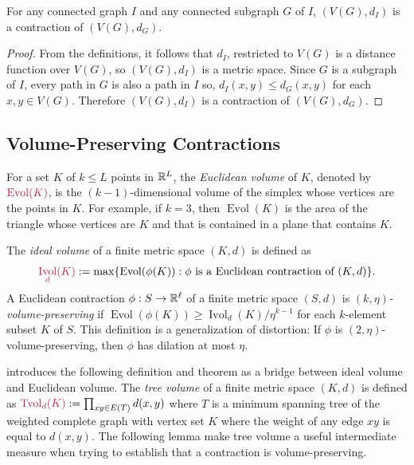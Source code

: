 \documentclass{patmorin}
\makeatletter
\renewcommand{\ge}{\geqslant}
\renewcommand{\le}{\leqslant}
\newcommand{\defin}[1]{\emph{\textcolor{brightmaroon}{#1}}}
\def\mathcolor#1#{\@mathcolor{#1}}
\def\@mathcolor#1#2#3{%
  \protect\leavevmode
  \begingroup
    \color#1{#2}#3%
  \endgroup
}
\newcommand{\mathdefin}[1]{\mathcolor{brightmaroon}{#1}}
\DeclareMathOperator{\evol}{Evol}
\DeclareMathOperator{\ivol}{Ivol}
\DeclareMathOperator{\tvol}{Tvol}
\makeatother
\begin{document}
\begin{obs}\label{supergraph_contraction}
  For any connected graph $I$ and any connected subgraph $G$ of $I$, $(V(G),d_I)$ is a contraction of $(V(G),d_G)$.
\end{obs}

\begin{proof}
  From the definitions, it follows that $d_I$, restricted to $V(G)$ is a distance function over $V(G)$, so $(V(G),d_I)$ is a metric space.  Since $G$ is a subgraph of $I$, every path in $G$ is also a path in $I$ so, $d_I(x,y)\le d_G(x,y)$ for each $x,y\in V(G)$.  Therefore $(V(G),d_I)$ is a contraction of $(V(G),d_G)$.
\end{proof}



\subsection{Volume-Preserving Contractions}
\label{contractions_section}

For a set $K$ of $k\le L$ points in $\mathbb{R}^L$, the \defin{Euclidean volume} of $K$, denoted by $\mathdefin{\evol(K)}$, is the $(k-1)$-dimensional volume of the simplex whose vertices are the points in $K$.  For example, if $k=3$, then $\evol(K)$ is the area of the triangle whose vertices are $K$ and that is contained in a plane that contains $K$.

The \defin{ideal volume} of a finite metric space $(K,d)$ is defined as $$\mathdefin{\ivol_d(K)}:=\max\{\evol(\phi(K)):\text{$\phi$ is a Euclidean contraction of $(K,d)$}\}.$$  A Euclidean contraction $\phi:S\to\mathbb{R}^{\ell}$ of a finite metric space $(S,d)$ is \defin{$(k,\eta)$-volume-preserving} if $\evol(\phi(K))\ge \ivol_d(K)/\eta^{k-1}$ for each $k$-element subset $K$ of $S$.  This definition is a generalization of distortion: If $\phi$ is $(2,\eta)$-volume-preserving, then $\phi$ has dilation at most $\eta$.

\citet{feige:approximating} introduces the following definition and theorem as a bridge between ideal volume and Euclidean volume. The \defin{tree volume} of a finite metric space $(K,d)$ is defined as $\mathdefin{\tvol_d(K)}:=\prod_{xy\in E(T)} d(x,y)$ where $T$ is a minimum spanning tree of the weighted complete graph with vertex set $K$ where the weight of any edge $xy$ is equal to $d(x,y)$.  The following lemma make tree volume a useful intermediate measure when trying to establish that a contraction is volume-preserving.
\end{document}
